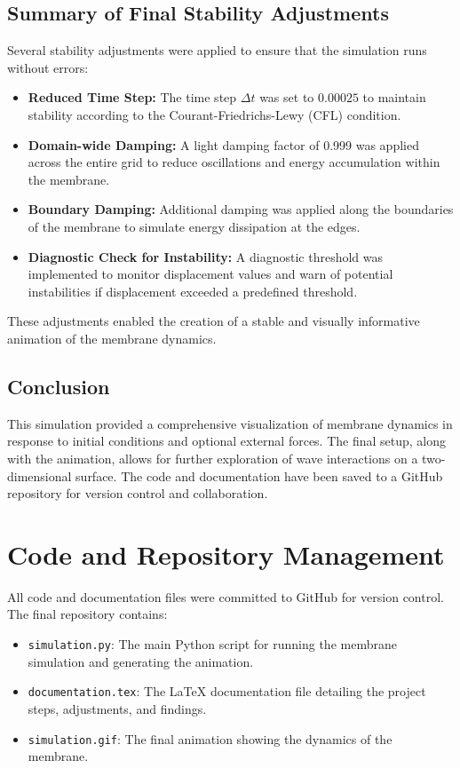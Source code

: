\documentclass{article}
\begin{document}
\subsection{Summary of Final Stability Adjustments}
Several stability adjustments were applied to ensure that the simulation runs without errors:
\begin{itemize}
    \item \textbf{Reduced Time Step:} The time step $\Delta t$ was set to $0.00025$ to maintain stability according to the Courant-Friedrichs-Lewy (CFL) condition.
    \item \textbf{Domain-wide Damping:} A light damping factor of 0.999 was applied across the entire grid to reduce oscillations and energy accumulation within the membrane.
    \item \textbf{Boundary Damping:} Additional damping was applied along the boundaries of the membrane to simulate energy dissipation at the edges.
    \item \textbf{Diagnostic Check for Instability:} A diagnostic threshold was implemented to monitor displacement values and warn of potential instabilities if displacement exceeded a predefined threshold.
\end{itemize}

These adjustments enabled the creation of a stable and visually informative animation of the membrane dynamics.

\subsection{Conclusion}
This simulation provided a comprehensive visualization of membrane dynamics in response to initial conditions and optional external forces. The final setup, along with the animation, allows for further exploration of wave interactions on a two-dimensional surface. The code and documentation have been saved to a GitHub repository for version control and collaboration.

\section{Code and Repository Management}
All code and documentation files were committed to GitHub for version control. The final repository contains:
\begin{itemize}
    \item \texttt{simulation.py}: The main Python script for running the membrane simulation and generating the animation.
    \item \texttt{documentation.tex}: The LaTeX documentation file detailing the project steps, adjustments, and findings.
    \item \texttt{simulation.gif}: The final animation showing the dynamics of the membrane.
\end{itemize}
\end{document}
